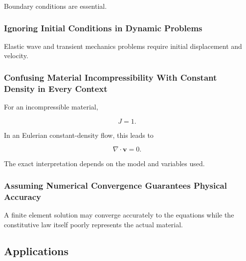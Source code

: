 Boundary conditions are essential.

\subsubsection{Ignoring Initial Conditions in Dynamic Problems}

Elastic wave and transient mechanics problems require initial displacement
and velocity.

\subsubsection{Confusing Material Incompressibility With Constant Density in Every Context}

For an incompressible material,

\[
J=1.
\]

In an Eulerian constant-density flow, this leads to

\[
\nabla\cdot\mathbf{v}=0.
\]

The exact interpretation depends on the model and variables used.

\subsubsection{Assuming Numerical Convergence Guarantees Physical Accuracy}

A finite element solution may converge accurately to the equations while the
constitutive law itself poorly represents the actual material.

\subsection{Applications}
\label{subsec:continuum-mechanics-applications}

